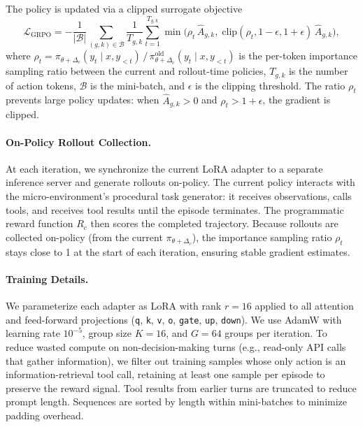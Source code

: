 The policy is updated via a clipped surrogate objective
\begin{equation}
    \mathcal{L}_{\text{GRPO}} = -\frac{1}{|\mathcal{B}|}\sum_{(g,k) \in \mathcal{B}}
    \frac{1}{T_{g,k}} \sum_{t=1}^{T_{g,k}}
    \min\!\bigl(
        \rho_t \, \hat{A}_{g,k},\;
        \text{clip}(\rho_t, 1{-}\epsilon, 1{+}\epsilon)\,\hat{A}_{g,k}
    \bigr),
    \label{eq:grpo}
\end{equation}
where $\rho_t = \pi_{\theta+\Delta_c}(y_t \mid x, y_{<t}) \,/\,
\pi_{\theta+\Delta_c}^{\text{old}}(y_t \mid x, y_{<t})$ is the per-token
importance sampling ratio between the current and rollout-time policies,
$T_{g,k}$ is the number of action tokens, $\mathcal{B}$ is the mini-batch, and
$\epsilon$ is the clipping threshold.  The ratio $\rho_t$ prevents large policy
updates: when $\hat{A}_{g,k} > 0$ and $\rho_t > 1 + \epsilon$, the gradient
is clipped.

\paragraph{On-Policy Rollout Collection.}
At each iteration, we synchronize the current LoRA adapter to a separate
inference server and generate rollouts on-policy.  The current policy interacts
with the micro-environment's procedural task generator: it receives observations,
calls tools, and receives tool results until the episode terminates.  The
programmatic reward function $R_c$ then scores the completed trajectory.
Because rollouts are collected on-policy (from the current $\pi_{\theta +
\Delta_c}$), the importance sampling ratio $\rho_t$ stays close to 1 at the
start of each iteration, ensuring stable gradient estimates.

\paragraph{Training Details.}
We parameterize each adapter as LoRA with rank $r{=}16$ applied to all
attention and feed-forward projections (\texttt{q}, \texttt{k}, \texttt{v},
\texttt{o}, \texttt{gate}, \texttt{up}, \texttt{down}).  We use AdamW with
learning rate $10^{-5}$, group size $K{=}16$, and $G{=}64$ groups per
iteration.  To reduce wasted compute on non-decision-making turns (e.g.,
read-only API calls that gather information), we filter out training samples
whose only action is an information-retrieval tool call, retaining at
least one sample per episode to preserve the reward signal.  Tool results
from earlier turns are truncated to reduce prompt length.  Sequences are
sorted by length within mini-batches to minimize padding overhead.

